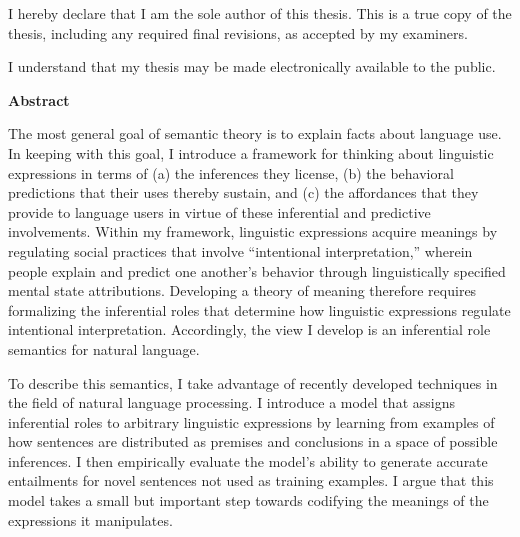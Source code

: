 \cleardoublepage %
 


  \noindent
I hereby declare that I am the sole author of this thesis. This is a true copy of the thesis, including any required final revisions, as accepted by my examiners.

  \bigskip
  
  \noindent
I understand that my thesis may be made electronically available to the public.

\cleardoublepage


\begin{center}\textbf{Abstract}\end{center}

The most general goal of semantic theory is to explain facts about language use. In keeping with this goal, I introduce a framework for thinking about linguistic expressions in terms of (a) the inferences they license, (b) the behavioral predictions that their uses thereby sustain, and (c) the affordances that they provide to language users in virtue of these inferential and predictive involvements. Within my framework, linguistic expressions acquire meanings by regulating social practices that involve ``intentional interpretation,'' wherein people explain and predict one another's behavior through linguistically specified mental state attributions. Developing a theory of meaning therefore requires formalizing the inferential roles that determine how linguistic expressions regulate intentional interpretation. Accordingly, the view I develop is an inferential role semantics for natural language.

To describe this semantics, I take advantage of recently developed techniques in the field of natural language processing. I introduce a model that assigns inferential roles to arbitrary linguistic expressions by learning from examples of how sentences are distributed as premises and conclusions in a space of possible inferences. I then empirically evaluate the model's ability to generate accurate entailments for novel sentences not used as training examples. I argue that this model takes a small but important step towards codifying the meanings of the expressions it manipulates.

